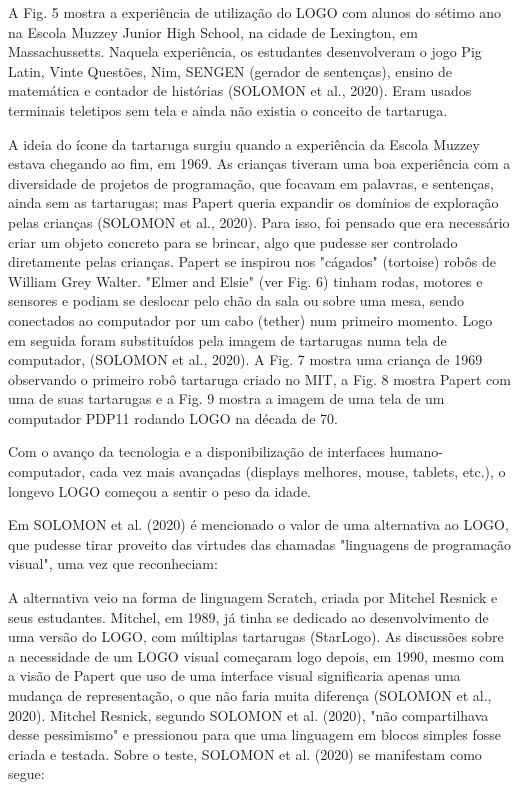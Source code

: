 A Fig. 5 mostra a experiência de utilização do LOGO com alunos do sétimo ano na Escola Muzzey Junior High School, na cidade de Lexington, em Massachussetts. Naquela experiência, os estudantes desenvolveram o jogo Pig Latin, Vinte Questões, Nim, SENGEN (gerador de sentenças), ensino de matemática e contador de histórias  (SOLOMON et al., 2020). Eram usados terminais teletipos sem tela e ainda não existia o conceito de tartaruga.

A ideia do ícone da tartaruga surgiu quando a experiência da Escola Muzzey estava chegando ao fim, em 1969. As crianças tiveram uma boa experiência com a diversidade de projetos de programação, que focavam em palavras, e sentenças, ainda sem as tartarugas; mas Papert queria expandir os domínios de exploração pelas crianças (SOLOMON et al., 2020). Para isso, foi pensado que era necessário criar um objeto concreto para se brincar, algo que pudesse ser controlado diretamente pelas crianças. Papert se inspirou nos "cágados"  (tortoise) robôs de William Grey Walter. "Elmer and Elsie" (ver Fig. 6) tinham rodas, motores e sensores e podiam se deslocar pelo chão da sala ou sobre uma mesa, sendo conectados ao computador por um cabo (tether) num primeiro momento. Logo em seguida foram substituídos pela imagem de tartarugas numa tela de computador, (SOLOMON et al., 2020). A Fig. 7 mostra uma criança de 1969 observando o primeiro robô tartaruga criado no MIT, a Fig. 8 mostra Papert com uma de suas tartarugas e a Fig. 9 mostra a imagem de uma tela de um computador PDP11 rodando LOGO na década de 70.

Com o avanço da tecnologia e a disponibilização de interfaces humano-computador, cada vez mais avançadas (displays melhores, mouse, tablets, etc.), o longevo LOGO começou a sentir o peso da idade.

Em SOLOMON et al. (2020) é mencionado o valor de uma alternativa ao LOGO, que pudesse tirar proveito das virtudes das chamadas "linguagens de programação visual", uma vez que reconheciam:


\noindent\begin{flushright}\mbox{\linespread{1}\selectfont\centering{}}\end{flushright}


A alternativa veio na forma de linguagem Scratch, criada por Mitchel Resnick e seus estudantes. Mitchel, em 1989, já tinha se dedicado ao desenvolvimento de uma versão do LOGO, com múltiplas tartarugas (StarLogo). As discussões sobre a necessidade de um  LOGO visual começaram logo depois, em 1990, mesmo com a visão de Papert que uso de uma interface visual significaria apenas uma mudança de representação, o que não faria muita diferença   (SOLOMON et al., 2020). Mitchel Resnick, segundo  SOLOMON et al. (2020), "não compartilhava desse pessimismo" e pressionou para que uma linguagem em blocos simples fosse criada e testada. Sobre o teste,  SOLOMON et al. (2020) se manifestam como segue:


